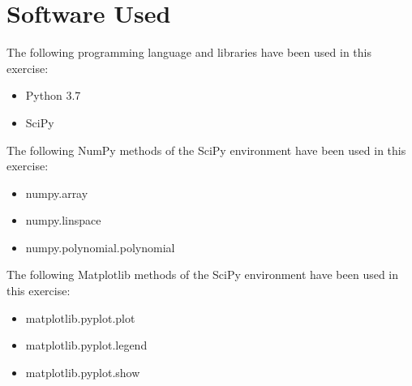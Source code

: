 \documentclass{article}
\begin{document}
\section{Software Used}
The following programming language and libraries have been used in this exercise:
\begin{itemize}
  \item Python 3.7
  \item SciPy
\end{itemize}
The following NumPy methods of the SciPy environment have been used in this exercise:
\begin{itemize}
  \item numpy.array
  \item numpy.linspace
  \item numpy.polynomial.polynomial
  \end{itemize}
The following Matplotlib methods of the SciPy environment have been used in this exercise:
 \begin{itemize}
  \item matplotlib.pyplot.plot
  \item matplotlib.pyplot.legend
  \item matplotlib.pyplot.show
  \end{itemize}
\end{document}
